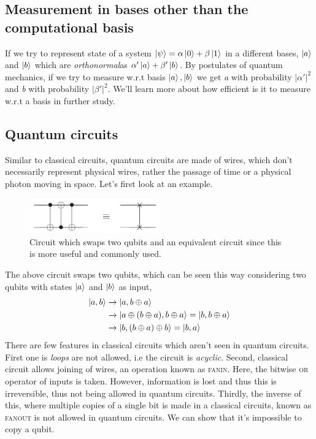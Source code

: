 \subsection{Measurement in bases other than the computational basis}
If we try to represent state of a system $\ket{\psi} = \alpha \ket{0} + \beta \ket{1}$ in a different bases, $\ket{a}$ and $\ket{b}$ which are \textit{orthonormal}as $\alpha'\ket{a}+\beta'\ket{b}$. By postulates of quantum mechanics, if we try to measure w.r.t basis $\ket{a}, \ket{b}$ we get \textit{a} with probability $|\alpha'|^2$ and \textit{b} with probability $|\beta'|^2$. We'll learn more about how efficient is it to measure w.r.t a basis in further study.

\subsection{Quantum circuits}
Similar to classical circuits, quantum circuits are made of wires, which don't necessarily represent physical wires, rather the passage of time or a physical photon moving in space. Let's first look at an example.
\begin{figure}[H]
    \centering
    \includegraphics[width=0.5\textwidth]{images/simple_circuit.png}
    \caption{Circuit which swaps two qubits and an equivalent circuit since this is more useful and commonly used.}
    \label{fig:simple-circuit}
\end{figure}
The above circuit swaps two qubits, which can be seen this way considering two qubits with states $\ket{a}$ and $\ket{b}$ as input,
\begin{align}
    \ket{a,b} &\xrightarrow{} \ket{a, b\oplus a} \\
              &\xrightarrow{} \ket{a \oplus (b \oplus a), b \oplus a} = \ket{b, b\oplus a}\\
              &\xrightarrow{} \ket{b, (b\oplus a) \oplus b} = \ket{b, a}
\end{align}
There are few features in classical circuits which aren't seen in quantum circuits. First one is \textit{loops} are not allowed, i.e the circuit is \textit{acyclic}. Second, classical circuit allows joining of wires, an operation known as \textsc{fanin}. Here, the bitwise \textsc{or} operator of inputs is taken. However, information is lost and thus this is irreversible, thus not being allowed in quantum circuits. Thirdly, the inverse of this, where multiple copies of a single bit is made in a classical circuits, known as \textsc{fanout} is not allowed in quantum circuits. We can show that it's impossible to copy a qubit.

